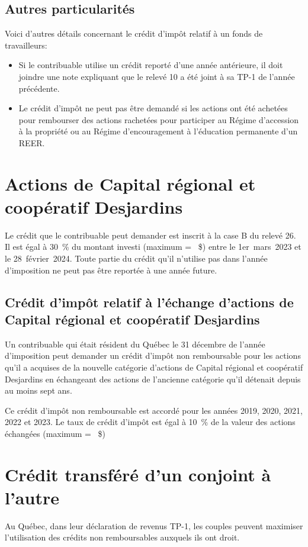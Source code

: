 \subsection{Autres particularités}
Voici d'autres détails concernant le crédit d'impôt relatif à un fonds de travailleurs:
\begin{itemize}
	\item Si le contribuable utilise un crédit reporté d'une année antérieure, il doit joindre une note expliquant que le relevé 10 a été joint à sa TP-1 de l'année précédente.
	\item Le crédit d'impôt ne peut pas être demandé si les actions ont été achetées pour rembourser des actions rachetées pour participer au Régime d'accession à la propriété ou au Régime d'encouragement à l'éducation permanente d'un REER. 
\end{itemize}



\section{Actions de Capital régional et coopératif Desjardins}
Le crédit que le contribuable peut demander est inscrit à la case B du relevé 26. Il est égal à 30~\% du montant investi (maximum = ~\$) entre le 1er~mars~2023 et le 28~février~2024. Toute partie du crédit qu'il n'utilise pas dans l'année d'imposition ne peut pas être reportée à une année future. 

\subsection{Crédit d'impôt relatif à l'échange d'actions de Capital régional et coopératif Desjardins}
Un contribuable qui était résident du Québec le 31 décembre de l'année d'imposition peut demander un crédit d'impôt non remboursable pour les actions qu'il a acquises de la nouvelle catégorie d'actions de Capital régional et coopératif Desjardins en échangeant des actions de l'ancienne catégorie qu'il détenait depuis au moins sept ans.

Ce crédit d'impôt non remboursable est accordé pour les années 2019, 2020, 2021, 2022 et 2023. Le taux de crédit d'impôt est égal à 10~\% de la valeur des actions échangées (maximum = ~\$)



\section{Crédit transféré d'un conjoint à l'autre}
\begin{intro}
	Au Québec, dans leur déclaration de revenus TP-1, les couples peuvent maximiser l'utilisation des crédits non remboursables auxquels ils ont droit.
\end{intro}

